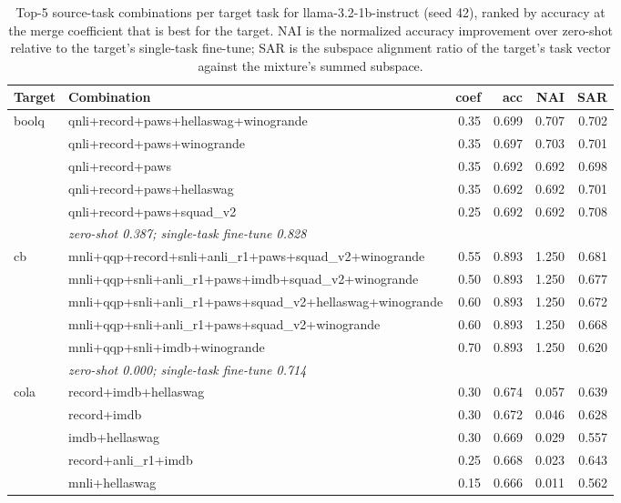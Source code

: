 \begin{table}[t]
  \centering
  \caption{Top-5 source-task combinations per target task for llama-3.2-1b-instruct (seed 42), ranked by accuracy at the merge coefficient that is best for the target. NAI is the normalized accuracy improvement over zero-shot relative to the target's single-task fine-tune; SAR is the subspace alignment ratio of the target's task vector against the mixture's summed subspace.}
  \label{tab:target-transfer}
  \begin{tabular}{llrrrr}
    \toprule
    Target & Combination & coef & acc & NAI & SAR \\
    \midrule
    boolq & qnli+record+paws+hellaswag+winogrande & 0.35 & 0.699 & 0.707 & 0.702 \\
     & qnli+record+paws+winogrande & 0.35 & 0.697 & 0.703 & 0.701 \\
     & qnli+record+paws & 0.35 & 0.692 & 0.692 & 0.698 \\
     & qnli+record+paws+hellaswag & 0.35 & 0.692 & 0.692 & 0.701 \\
     & qnli+record+paws+squad\_v2 & 0.25 & 0.692 & 0.692 & 0.708 \\
    & \multicolumn{5}{l}{\textit{zero-shot 0.387; single-task fine-tune 0.828}} \\
    \addlinespace
    cb & mnli+qqp+record+snli+anli\_r1+paws+squad\_v2+winogrande & 0.55 & 0.893 & 1.250 & 0.681 \\
     & mnli+qqp+snli+anli\_r1+paws+imdb+squad\_v2+winogrande & 0.50 & 0.893 & 1.250 & 0.677 \\
     & mnli+qqp+snli+anli\_r1+paws+squad\_v2+hellaswag+winogrande & 0.60 & 0.893 & 1.250 & 0.672 \\
     & mnli+qqp+snli+anli\_r1+paws+squad\_v2+winogrande & 0.60 & 0.893 & 1.250 & 0.668 \\
     & mnli+qqp+snli+imdb+winogrande & 0.70 & 0.893 & 1.250 & 0.620 \\
    & \multicolumn{5}{l}{\textit{zero-shot 0.000; single-task fine-tune 0.714}} \\
    \addlinespace
    cola & record+imdb+hellaswag & 0.30 & 0.674 & 0.057 & 0.639 \\
     & record+imdb & 0.30 & 0.672 & 0.046 & 0.628 \\
     & imdb+hellaswag & 0.30 & 0.669 & 0.029 & 0.557 \\
     & record+anli\_r1+imdb & 0.25 & 0.668 & 0.023 & 0.643 \\
     & mnli+hellaswag & 0.15 & 0.666 & 0.011 & 0.562 \\

\end{tabular}
\end{table}
